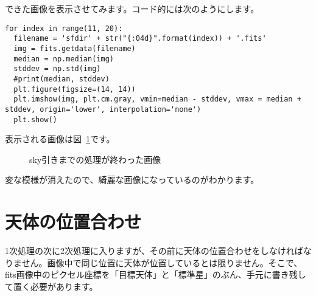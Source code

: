 できた画像を表示させてみます。コード的には次のようにします。
\begin{lstlisting}[caption=作成した画像の表示,label=code_3_5_3]
for index in range(11, 20):
  filename = 'sfdir' + str("{:04d}".format(index)) + '.fits'
  img = fits.getdata(filename)
  median = np.median(img)
  stddev = np.std(img)
  #print(median, stddev)
  plt.figure(figsize=(14, 14))
  plt.imshow(img, plt.cm.gray, vmin=median - stddev, vmax = median + stddev, origin='lower', interpolation='none')
  plt.show()
\end{lstlisting}
表示される画像は図~\ref{fig_3_7}です。
\begin{figure}
  \centering
  \caption[sky引きまでの処理が終わった画像]{sky引きまでの処理が終わった画像}
  \label{fig_3_7}
\end{figure}
変な模様が消えたので、綺麗な画像になっているのがわかります。

\section{天体の位置合わせ}
\label{sec_3_6}
1次処理の次に2次処理に入りますが、その前に天体の位置合わせをしなければなりません。画像中で同じ位置に天体が位置しているとは限りません。そこで、fits画像中のピクセル座標を「目標天体」と「標準星」のぶん、手元に書き残して置く必要があります。

